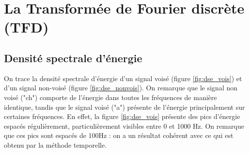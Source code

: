 \documentclass[french]{article}
\begin{document}
\FloatBarrier
\section{La Transformée de Fourier discrète (TFD)}

\subsection{Densité spectrale d'énergie}
On trace la densité spectrale d'énergie d'un signal voisé (figure \ref{fig:dse_vois}) et d'un signal non-voisé (figure \ref{fig:dse_nonvois}). On remarque que le signal non voisé ("ch") comporte de l'énergie dans toutes les fréquences de manière identique, tandis que le signal voisé ("a") présente de l'énergie principalement sur certaines fréquences. En effet, la figure \ref{fig:dse_vois} présente des pics d'énergie espacés régulièrement, particulièrement visibles entre 0 et 1000 Hz. On remarque que ces pics sont espacés de 100Hz : on a un résultat cohérent avec ce qui est obtenu par la méthode temporelle.
\end{document}
